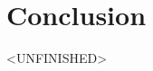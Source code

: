 \documentclass[runningheads,a4paper]{llncs}
\begin{document}
\section{Conclusion}\label{sec:conc}
<UNFINISHED>


















\end{document}
